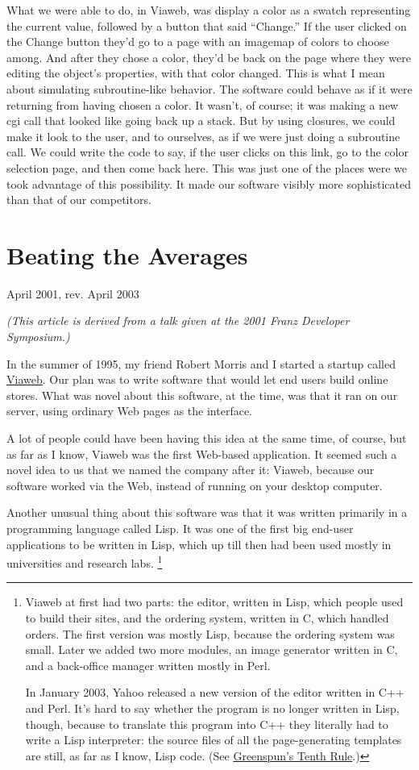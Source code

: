 \documentclass[12pt]{book}
\begin{document}
What we were able to do, in Viaweb, was display a color as a swatch
representing the current value, followed by a button that said
``Change.'' If the user clicked on the Change button they'd go to a page
with an imagemap of colors to choose among. And after they chose a
color, they'd be back on the page where they were editing the object's
properties, with that color changed. This is what I mean about
simulating subroutine-like behavior. The software could behave as if it
were returning from having chosen a color. It wasn't, of course; it was
making a new cgi call that looked like going back up a stack. But by
using closures, we could make it look to the user, and to ourselves, as
if we were just doing a subroutine call. We could write the code to say,
if the user clicks on this link, go to the color selection page, and
then come back here. This was just one of the places were we took
advantage of this possibility. It made our software visibly more
sophisticated than that of our competitors.
\chapter{Beating the Averages}

April 2001, rev. April 2003

\emph{(This article is derived from a talk given at the 2001 Franz
Developer Symposium.)}

In the summer of 1995, my friend Robert Morris and I started a startup
called \href{http://docs.yahoo.com/docs/pr/release184.html}{Viaweb}. Our
plan was to write software that would let end users build online stores.
What was novel about this software, at the time, was that it ran on our
server, using ordinary Web pages as the interface.

A lot of people could have been having this idea at the same time, of
course, but as far as I know, Viaweb was the first Web-based
application. It seemed such a novel idea to us that we named the company
after it: Viaweb, because our software worked via the Web, instead of
running on your desktop computer.

Another unusual thing about this software was that it was written
primarily in a programming language called Lisp. It was one of the first
big end-user applications to be written in Lisp, which up till then had
been used mostly in universities and research labs. \footnote{Viaweb at first had two parts: the editor, written in Lisp,
which people used to build their sites, and the ordering system, written
in C, which handled orders. The first version was mostly Lisp, because
the ordering system was small. Later we added two more modules, an image
generator written in C, and a back-office manager written mostly in
Perl.

In January 2003, Yahoo released a new version of the editor written in
C++ and Perl. It's hard to say whether the program is no longer written
in Lisp, though, because to translate this program into C++ they
literally had to write a Lisp interpreter: the source files of all the
page-generating templates are still, as far as I know, Lisp code. (See
\href{quotes.html}{Greenspun's Tenth Rule}.)}
\end{document}
